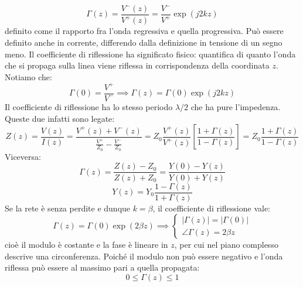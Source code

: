 \documentclass{book}
\begin{document}
        \begin{equation}
            \Gamma (z) = \frac{V^{-}(z)}{V^{+}(z)} = \frac{V^{-}}{V^{+}}\exp(j2kz)
        \end{equation}
        definito come il rapporto fra l'onda regressiva e quella progressiva. Può essere definito anche in corrente, differendo dalla
        definizione in tensione di un segno meno. Il coefficiente di riflessione ha significato fisico: quantifica di quanto l'onda che si 
        propaga sulla linea viene riflessa in corrispondenza della coordinata $z$. Notiamo che:
        \begin{equation}
            \Gamma(0)=\frac{V^{+}}{V^{-}} \implies \Gamma(z) = \Gamma(0)\exp(j2kz)
        \end{equation}
        Il coefficiente di riflessione ha lo stesso periodo $\lambda/2$ che ha pure l'impedenza. Queste due 
        infatti sono legate:
        \begin{equation}
            Z(z)=\frac{V(z)}{I(z)}=\displaystyle \frac{V^{+}(z)+V^{-}(z)}{\displaystyle \frac{V^{+}}{Z_{0}}-\frac{V^{-}}{Z_{0}}}
            = Z_{0}\frac{V^{+}(z)}{V^{+}(z)}[\frac{1+\Gamma(z)}{1-\Gamma(z)}] = Z_{0}\frac{1+\Gamma(z)}{1-\Gamma(z)} 
        \end{equation}
        Viceversa:
        \begin{equation}
            \Gamma(z)=\frac{Z(z)-Z_{0}}{Z(z)+Z_{0}} = \frac{Y(0)-Y(z)}{Y(0)+Y(z)}
        \end{equation}
        \begin{equation}
            Y(z)=Y_{0} \frac{1-\Gamma(z)}{1+\Gamma(z)}
        \end{equation}
        Se la rete è senza perdite e dunque $k=\beta$, il coefficiente di riflessione vale:
        \begin{equation}
            \Gamma (z)=\Gamma (0)\exp(2 \beta z) \implies \begin{cases}
                |\Gamma(z)|=|\Gamma(0)| \\
                \angle \Gamma(z) = 2 \beta z
            \end{cases}
        \end{equation}
        cioè il modulo è costante e la fase è lineare in $z$, per cui nel piano complesso descrive una circonferenza. Poiché 
        il modulo non può essere negativo e l'onda riflessa può essere al massimo pari a quella propagata:
        \begin{equation}
            0 \leq \Gamma(z) \leq 1
        \end{equation}
\end{document}
